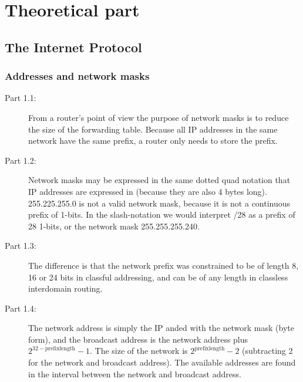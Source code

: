 \section{Theoretical part}

\subsection{The Internet Protocol}
\subsubsection{Addresses and network masks}
\begin{description}
    \item[Part 1.1:] From a router's point of view the purpose of network masks is to
        reduce the size of the forwarding table. Because all IP addresses in the same network
        have the same prefix, a router only needs to store the prefix.
    \item[Part 1.2:] Network masks may be expressed in the same dotted quad notation
        that IP addresses are expressed in (because they are also 4 bytes long).
        255.225.255.0 is not a valid network mask, because it is not a continuous
        prefix of 1-bits. In the slash-notation we would interpret /28 as a prefix
        of 28 1-bits, or the network mask 255.255.255.240.
    \item[Part 1.3:] The difference is that the network prefix was constrained to be of length
        8, 16 or 24 bits in classful addressing, and can be of any length in classless
        interdomain routing.
    \item[Part 1.4:] The network address is simply the IP anded with the network mask (byte form),
        and the broadcast address is the network address plus \\$2^{32-\text{prefixlength}} - 1$.
        The size of the network is $2^{\text{prefixlength}} - 2$ (subtracting 2 for the network
        and broadcast address). The available addresses are found in the interval between the network
        and broadcast address.


\end{description}
